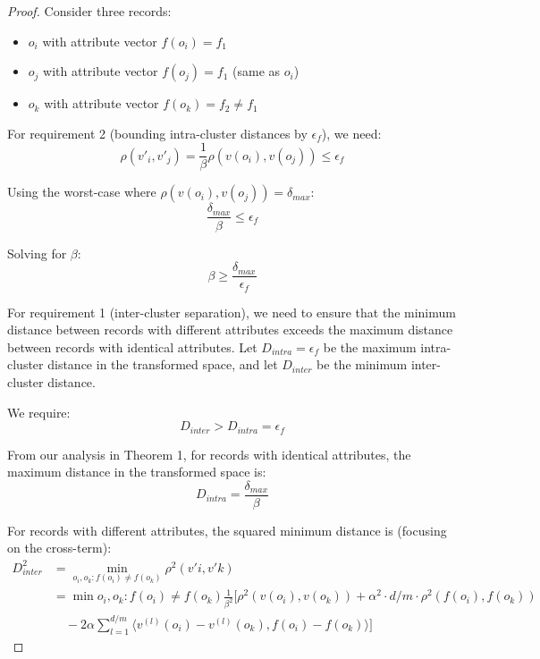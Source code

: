 \documentclass[numbers,sort]{article}
\begin{document}
\begin{proof}
Consider three records:
\begin{itemize}
\item $o_i$ with attribute vector $f(o_i) = f_1$
\item $o_j$ with attribute vector $f(o_j) = f_1$ (same as $o_i$)
\item $o_k$ with attribute vector $f(o_k) = f_2 \neq f_1$
\end{itemize}

For requirement 2 (bounding intra-cluster distances by $\epsilon_f$), we need:
\begin{equation}
\rho(v'_i, v'_j) = \frac{1}{\beta}\rho(v(o_i), v(o_j)) \leq \epsilon_f
\end{equation}

Using the worst-case where $\rho(v(o_i), v(o_j)) = \delta_{max}$:
\begin{equation}
\frac{\delta_{max}}{\beta} \leq \epsilon_f
\end{equation}

Solving for $\beta$:
\begin{equation}
\beta \geq \frac{\delta_{max}}{\epsilon_f}
\end{equation}

For requirement 1 (inter-cluster separation), we need to ensure that the minimum distance between records with different attributes exceeds the maximum distance between records with identical attributes. Let $D_{intra} = \epsilon_f$ be the maximum intra-cluster distance in the transformed space, and let $D_{inter}$ be the minimum inter-cluster distance.

We require:
\begin{equation}
D_{inter} > D_{intra} = \epsilon_f
\end{equation}

From our analysis in Theorem 1, for records with identical attributes, the maximum distance in the transformed space is:
\begin{equation}
D_{intra} = \frac{\delta_{max}}{\beta}
\end{equation}

For records with different attributes, the squared minimum distance is (focusing on the cross-term):
\begin{align}
D_{inter}^2 &= \min_{o_i, o_k: f(o_i) \neq f(o_k)} \rho^2(v'i, v'k) \\
&= \min{o_i, o_k: f(o_i) \neq f(o_k)} \frac{1}{\beta^2}\Big[\rho^2(v(o_i), v(o_k)) + \alpha^2 \cdot d/m \cdot \rho^2(f(o_i), f(o_k)) \\
&\quad - 2\alpha \sum_{l=1}^{d/m} \langle v^{(l)}(o_i) - v^{(l)}(o_k), f(o_i) - f(o_k) \rangle\Big]
\end{align}


\end{proof}
\end{document}
